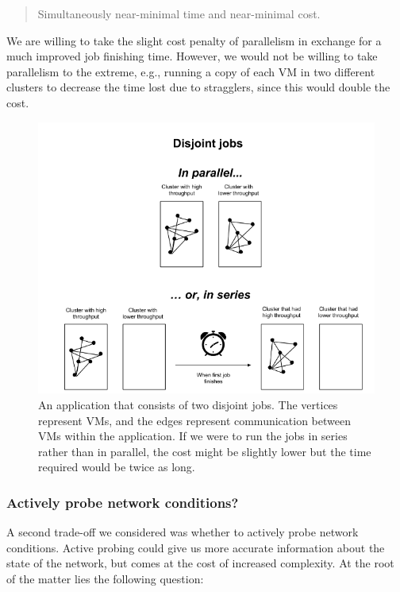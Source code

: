 \documentclass[11pt]{article}
\begin{document}
\begin{quote}
Simultaneously near-minimal time and near-minimal cost.
\end{quote}
We are willing to take the slight cost penalty of parallelism in exchange for a much improved job finishing time.  However, we would not be willing to take parallelism to the extreme, e.g., running a copy of each VM in two different clusters to decrease the time lost due to stragglers, since this would double the cost.

\begin{figure}[h]
  \centering
\includegraphics[scale=0.65]{disjointjobs.png}

 \caption{An application that consists of two disjoint jobs.  The vertices represent VMs, and the edges represent communication between VMs within the application.  If we were to run the jobs in series rather than in parallel, the cost might be slightly lower but the time required would be twice as long.}

 \label{fig:disjoint-jobs}
\end{figure}


\subsubsection{Actively probe network conditions?}

A second trade-off we considered was whether to actively probe network conditions.  Active probing could give us more accurate information about the state of the network, but comes at the cost of increased complexity.  At the root of the matter lies the following question:
\end{document}
